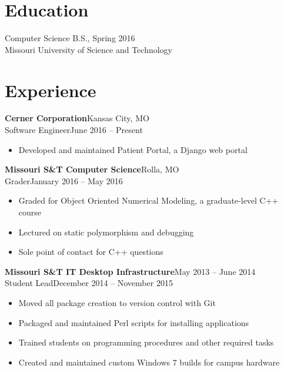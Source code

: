 \documentclass[margin]{res}
\begin{document}
  \begin{resume} 
    \section{Education} 
      Computer Science B.S., Spring 2016 \\
      Missouri University of Science and Technology \\

    \section{Experience}
       \textbf{Cerner Corporation}\hfill Kansas City, MO\\
         Software Engineer\hfill June 2016 -- Present\\
         \begin{itemize} \itemsep -1pt  %
            \item Developed and maintained Patient Portal, a Django web portal
         \end{itemize}

      \textbf{Missouri S\&T Computer Science}\hfill Rolla, MO\\
         Grader\hfill January 2016 -- May 2016
         \begin{itemize} \itemsep -1pt  %
           \item Graded for Object Oriented Numerical Modeling, a graduate-level C++ course
           \item Lectured on static polymorphism and debugging
           \item Sole point of contact for C++ questions
         \end{itemize}

       \textbf{Missouri S\&T IT Desktop Infrastructure}\hfill May 2013 -- June 2014\\
       Student Lead\hfill December 2014 -- November 2015
       \begin{itemize} \itemsep -1pt  %
         \item Moved all package creation to version control with Git
         \item Packaged and maintained Perl scripts for installing applications
         \item Trained students on programming procedures and other required tasks
         \item Created and maintained custom Windows 7 builds for campus hardware
       \end{itemize}
       

\end{resume}
\end{document}
